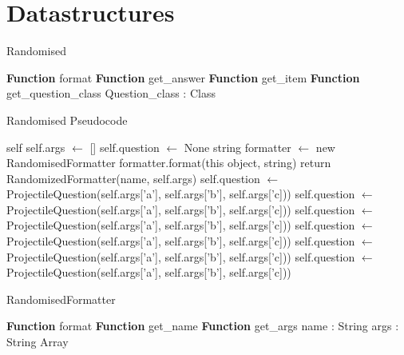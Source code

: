 \section{Datastructures}
	\algrenewcommand{}
	\begin{algorithm}[h]\label{randomised}
	\caption{Randomised}
	\begin{algorithmic}[1]
			\public
			\State \textbf{Function} format
			\State \textbf{Function} get\_answer
			\State \textbf{Function} get\_item
			\State \textbf{Function} get\_question\_class 
			\endpublic
			\private
			\State Question\_class : Class
			\endprivate
		\EndProcedure
	\end{algorithmic}
	\end{algorithm}
\begin{algorithm}[h]\label{randomisedps}
	\caption{Randomised Pseudocode}
	\begin{algorithmic}[1]
		 {self}
			\State self.args $\gets$ []
			\State self.question $\gets$ None
		\EndFunction
		 {string}
			\State formatter $\gets$ new RandomisedFormatter
			\State formatter.format(this object, string)
		\EndFunction
			\State return RandomizedFormatter(name, self.args)
		\EndFunction
			\State self.question $\gets$ ProjectileQuestion(self.args['a'], self.args['b'], self.args['c]))
			\EndIf
			\State self.question $\gets$ ProjectileQuestion(self.args['a'], self.args['b'], self.args['c]))
			\EndIf
			\State self.question $\gets$ ProjectileQuestion(self.args['a'], self.args['b'], self.args['c]))
			\EndIf
			\State self.question $\gets$ ProjectileQuestion(self.args['a'], self.args['b'], self.args['c]))
			\EndIf
			\State self.question $\gets$ ProjectileQuestion(self.args['a'], self.args['b'], self.args['c]))
			\EndIf
			\State self.question $\gets$ ProjectileQuestion(self.args['a'], self.args['b'], self.args['c]))
			\EndIf
		\EndFunction
		\EndProcedure
	\end{algorithmic}
\end{algorithm}
\begin{algorithm}[h]\label{randomisedFormatter}
	\caption{RandomisedFormatter}
	\begin{algorithmic}[1]
		\public
		\State \textbf{Function} format
		\State \textbf{Function} get\_name
		\State \textbf{Function} get\_args
		\endpublic
		\private
		\State name : String
		\State args : String Array
		\endprivate
		\EndProcedure
	\end{algorithmic}
\end{algorithm}
